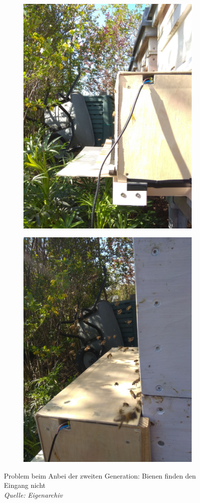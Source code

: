 \documentclass[11pt,a4paper]{article}
\begin{document}
\begin{figure}[H] \label{fig:second-generation-on-hive}
    \centering
    \begin{subfigure}{.45\textwidth}
        \includegraphics[width=.8\textwidth]{images/second-prototype-on-beehive.jpg}
    \end{subfigure}
    \hfill
    \begin{subfigure}{.45\textwidth}
        \includegraphics[width=.8\textwidth]{images/second-prototype-problem.jpg}
    \end{subfigure}
    \caption{Problem beim Anbei der zweiten Generation: Bienen finden den Eingang nicht\\
    \textit{Quelle: Eigenarchiv}}
\end{figure}
\end{document}

